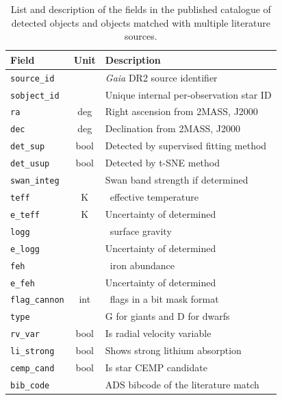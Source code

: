 \begin{table}
	\caption{List and description of the fields in the published catalogue of detected objects and objects matched with multiple literature sources.}
	\label{tab:out_table}
	\begin{tabular}{l c l}
		\hline
		Field & Unit & Description \\ 
		\hline
		\texttt{source\_id} & & {\it Gaia} DR2 source identifier \\
		\texttt{sobject\_id} & & Unique internal per-observation star ID \\
		\texttt{ra} & deg & Right ascension from 2MASS, J2000 \\
		\texttt{dec} & deg & Declination from 2MASS, J2000 \\
		\texttt{det\_sup} & bool & Detected by supervised fitting method \\
		\texttt{det\_usup} & bool & Detected by t-SNE method \\
		\texttt{swan\_integ} & & Swan band strength if determined \\
		\texttt{teff} & K & \TC\ effective temperature \Teff \\
		\texttt{e\_teff} & K & Uncertainty of determined \Teff \\
		\texttt{logg} & & \TC\ surface gravity \Logg \\
		\texttt{e\_logg} & & Uncertainty of determined \Logg \\
		\texttt{feh} & & \TC\ iron abundance \Feh \\
		\texttt{e\_feh} & & Uncertainty of determined \Feh \\
		\texttt{flag\_cannon} & int & \TC\ flags in a bit mask format \\
		\texttt{type} &  & G for giants and D for dwarfs \\
		\texttt{rv\_var} & bool & Is radial velocity variable \\
		\texttt{li\_strong} & bool & Shows strong lithium absorption \\
		\texttt{cemp\_cand} & bool & Is star CEMP candidate \\
		\texttt{bib\_code} &  & ADS bibcode of the literature match \\
		\hline
	\end{tabular}
\end{table}

